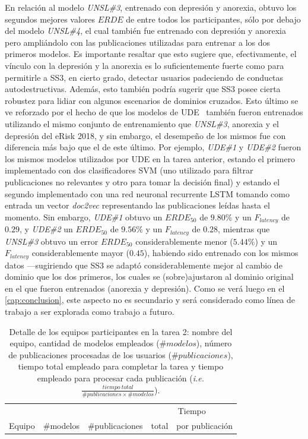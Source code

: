 \begin{itemize}
    En relación al modelo \emph{UNSL\#3}, entrenado con depresión y anorexia, obtuvo los segundos mejores valores $ERDE$ de entre todos los participantes, sólo por debajo del modelo \emph{UNSL\#4}, el cual también fue entrenado con depresión y anorexia pero ampliándolo con las publicaciones utilizadas para entrenar a los dos primeros modelos.
    Es importante resaltar que esto sugiere que, efectivamente, el vínculo con la depresión y la anorexia es lo suficientemente fuerte como para permitirle a SS3, en cierto grado, detectar usuarios padeciendo de conductas autodestructivas.
    Además, esto también podría sugerir que SS3 posee cierta robustez para lidiar con algunos escenarios de dominios cruzados.
    Esto último se ve reforzado por el hecho de que los modelos de UDE~\cite{masood2019ude} también fueron entrenados utilizando el mismo conjunto de entrenamiento que \emph{UNSL\#3}, anorexia y el depresión del eRisk 2018, y sin embargo, el desempeño de los mismos fue con diferencia más bajo que el de este último.
    Por ejemplo, \emph{UDE\#1} y \emph{UDE\#2} fueron los mismos modelos utilizados por UDE en la tarea anterior, estando el primero implementado con dos clasificadores SVM (uno utilizado para filtrar publicaciones no relevantes y otro para tomar la decisión final) y estando el segundo implementado con una red neuronal recurrente LSTM tomando como entrada un vector \emph{doc2vec} representando las publicaciones leídas hasta el momento.
    Sin embargo, \emph{UDE\#1} obtuvo un $ERDE_{50}$ de $9.80\%$ y un $F_{latency}$ de $0.29$, y \emph{UDE\#2} un $ERDE_{50}$ de $9.56\%$ y un $F_{latency}$ de $0.28$, mientras que \emph{UNSL\#3} obtuvo un error $ERDE_{50}$ considerablemente menor ($5.44\%$) y un $F_{latency}$ considerablemente mayor ($0.45$), habiendo sido entrenado con los mismos datos ---sugiriendo que SS3 se adaptó considerablemente mejor al cambio de dominio que los dos primeros, los cuales se (sobre)ajustaron al dominio original en el que fueron entrenados (anorexia y depresión).
    Como se verá luego en el \autoref{cap:conclusion}, este aspecto no es secundario y será considerado como línea de trabajo a ser explorada como trabajo a futuro.

\begin{table}[t!]
\centering
\caption{Detalle de los equipos participantes en la tarea 2: nombre del equipo, cantidad de modelos empleados ($\#modelos$), número de publicaciones procesadas de los usuarios ($\#publicaciones$), tiempo total empleado para completar la tarea y tiempo empleado para procesar cada publicación (\emph{i.e.} $\frac{tiempo\ total}{\#publicaciones\times\#modelos}$).}%
\label{tab:t2-time}
\begin{tabular}{l c c|c | c}
\hline
& & & \multicolumn{2}{c}{Tiempo} \\
Equipo & \#modelos & \#publicaciones & total & por publicación  \\ \hline


\end{tabular}
\end{table}
\end{itemize}
